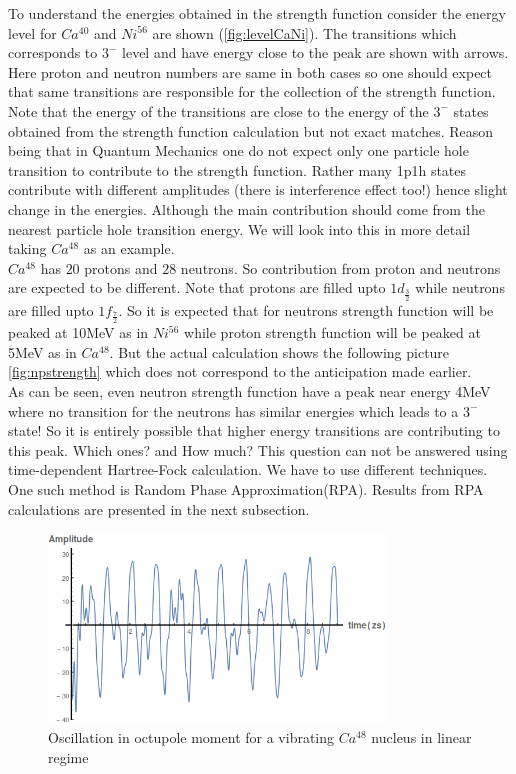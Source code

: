 \documentclass[a4paper]{paper}
\begin{document}
                    To understand the energies obtained in the strength function consider the energy level for $Ca^{40}$ and $Ni^{56}$ are shown (\ref{fig:levelCaNi}). The transitions which corresponds to  $3^{-}$ level and have energy close to the peak are shown with arrows. Here proton and neutron numbers are same in both cases so one should expect that same transitions are responsible for the collection of the strength function.\\
                    Note that the energy of the transitions are close to the energy of the $3^{-}$ states obtained from the strength function calculation but not exact matches. Reason being that in Quantum Mechanics one do not expect only one particle hole transition to contribute to the strength function.
                    Rather many 1p1h states contribute with different amplitudes (there is interference effect too!) hence slight change in the energies. Although the main contribution should come from the nearest particle hole transition energy. We will look into this in more detail taking $Ca^{48}$ as an example.\\
                    $Ca^{48}$ has $20$ protons and $28$ neutrons. So contribution from proton and neutrons are expected to be different. Note that protons are filled upto $1d_{\frac{3}{2}}$ while neutrons are filled upto $1f_{\frac{7}{2}}$. So it is expected that for neutrons strength function will be peaked at 10MeV as in $Ni^{56}$ while proton strength function will be peaked at 5MeV as in $Ca^{48}$. But the actual calculation shows the following picture \ref{fig:npstrength} which does not correspond to the anticipation made earlier. \\ 
                    As can be seen, even neutron strength function have a peak near energy 4MeV where no transition for the neutrons has similar energies which leads to a $3^{-}$ state! So it is entirely possible that higher energy transitions are contributing to this peak. Which ones? and How much? This question can not be answered using time-dependent Hartree-Fock calculation. We have to use different techniques. One such method is Random Phase Approximation(RPA). Results from RPA calculations are presented in the next subsection.
                    \begin{figure}
                        \centering
                        \includegraphics[width=0.8\textwidth,fbox]{image/Ca48moment}
                        \caption{Oscillation in octupole moment for a vibrating $Ca^{48}$ nucleus in linear regime}
                        \label{fig:Ca48moment}
                    \end{figure}
\end{document}
